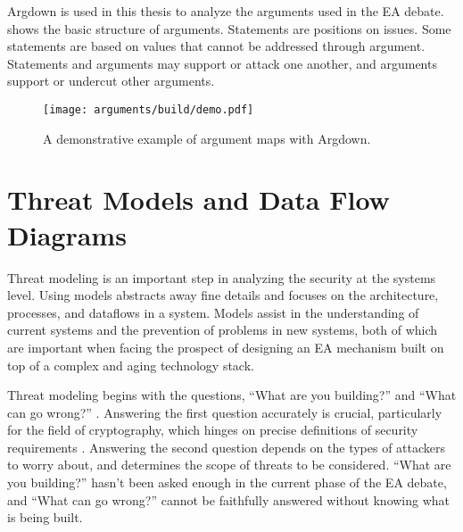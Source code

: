 Argdown is used in this thesis to analyze the arguments used in the \ac{EA} debate.  shows the
basic structure of arguments. Statements are positions on issues. Some statements are based on values that cannot be
addressed through argument. Statements and arguments may support or attack one another, and arguments support or
undercut other arguments.

\begin{figure}[ht]
    \centering\CaptionFontSize
    \texttt{[image: arguments/build/demo.pdf]}
    \caption[Argdown Demo]{A demonstrative example of argument maps with Argdown.}
    \label{fig-args-demo}
\end{figure}




\section{Threat Models and Data Flow Diagrams}
\label{sec-threat-model-intro}

Threat modeling is an important step in analyzing the security at the systems level. Using models abstracts away fine
details and focuses on the architecture, processes, and dataflows in a system. Models assist in the understanding of
current systems and the prevention of problems in new systems, both of which are important when facing the prospect of
designing an \ac{EA} mechanism built on top of a complex and aging technology stack.

Threat modeling begins with the questions, ``What are you building?'' and ``What can go wrong?''
\cite{shostack_threat_2014}. Answering the first question accurately is crucial, particularly for the field of
cryptography, which hinges on precise definitions of security requirements \cite{varia_2018}. Answering the second
question depends on the types of attackers to worry about, and determines the scope of threats to be considered. ``What
are you building?'' hasn't been asked enough in the current phase of the \ac{EA} debate, and ``What can go wrong?''
cannot be faithfully answered without knowing what is being built.

